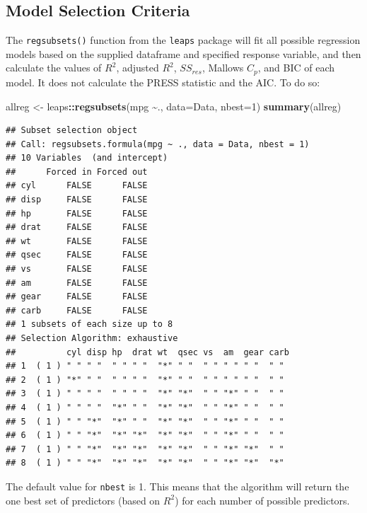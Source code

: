 \documentclass[
]{book}
\newenvironment{Shaded}{\begin{snugshade}}{\end{snugshade}}
\newcommand{\AttributeTok}[1]{\textcolor[rgb]{0.13,0.29,0.53}{#1}}
\newcommand{\DecValTok}[1]{\textcolor[rgb]{0.00,0.00,0.81}{#1}}
\newcommand{\FunctionTok}[1]{\textcolor[rgb]{0.13,0.29,0.53}{\textbf{#1}}}
\newcommand{\NormalTok}[1]{#1}
\newcommand{\OtherTok}[1]{\textcolor[rgb]{0.56,0.35,0.01}{#1}}
\newcommand{\SpecialCharTok}[1]{\textcolor[rgb]{0.81,0.36,0.00}{\textbf{#1}}}
\begin{document}
\hypertarget{model-selection-criteria-1}{%
\subsection*{Model Selection Criteria}\label{model-selection-criteria-1}}

The \texttt{regsubsets()} function from the \texttt{leaps} package will fit all possible regression models based on the supplied dataframe and specified response variable, and then calculate the values of \(R^2\), adjusted \(R^2\), \(SS_{res}\), Mallows \(C_p\), and BIC of each model. It does not calculate the PRESS statistic and the AIC. To do so:

\begin{Shaded}
\begin{Highlighting}[]
\NormalTok{allreg }\OtherTok{\textless{}{-}}\NormalTok{ leaps}\SpecialCharTok{::}\FunctionTok{regsubsets}\NormalTok{(mpg }\SpecialCharTok{\textasciitilde{}}\NormalTok{., }\AttributeTok{data=}\NormalTok{Data, }\AttributeTok{nbest=}\DecValTok{1}\NormalTok{)}
\FunctionTok{summary}\NormalTok{(allreg)}
\end{Highlighting}
\end{Shaded}

\begin{verbatim}
## Subset selection object
## Call: regsubsets.formula(mpg ~ ., data = Data, nbest = 1)
## 10 Variables  (and intercept)
##      Forced in Forced out
## cyl      FALSE      FALSE
## disp     FALSE      FALSE
## hp       FALSE      FALSE
## drat     FALSE      FALSE
## wt       FALSE      FALSE
## qsec     FALSE      FALSE
## vs       FALSE      FALSE
## am       FALSE      FALSE
## gear     FALSE      FALSE
## carb     FALSE      FALSE
## 1 subsets of each size up to 8
## Selection Algorithm: exhaustive
##          cyl disp hp  drat wt  qsec vs  am  gear carb
## 1  ( 1 ) " " " "  " " " "  "*" " "  " " " " " "  " " 
## 2  ( 1 ) "*" " "  " " " "  "*" " "  " " " " " "  " " 
## 3  ( 1 ) " " " "  " " " "  "*" "*"  " " "*" " "  " " 
## 4  ( 1 ) " " " "  "*" " "  "*" "*"  " " "*" " "  " " 
## 5  ( 1 ) " " "*"  "*" " "  "*" "*"  " " "*" " "  " " 
## 6  ( 1 ) " " "*"  "*" "*"  "*" "*"  " " "*" " "  " " 
## 7  ( 1 ) " " "*"  "*" "*"  "*" "*"  " " "*" "*"  " " 
## 8  ( 1 ) " " "*"  "*" "*"  "*" "*"  " " "*" "*"  "*"
\end{verbatim}

The default value for \texttt{nbest} is 1. This means that the algorithm will return the one best set of predictors (based on \(R^2\)) for each number of possible predictors.
\end{document}
